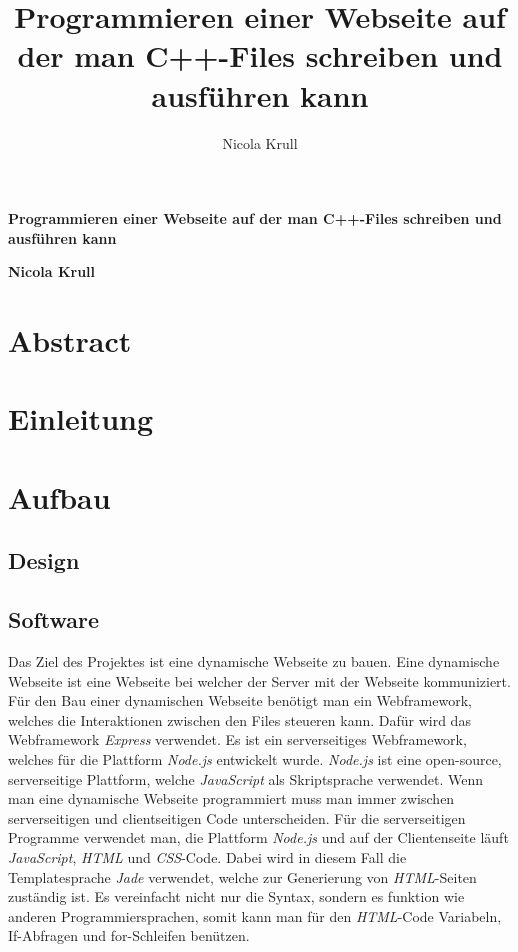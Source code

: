 \documentclass[10pt]{article}
\title{Programmieren einer Webseite auf der man C++-Files schreiben und ausführen kann}
\author{Nicola Krull}
\begin{document}
	
	\begin{titlepage}
	\begin{center}
	\huge
	\textbf{Programmieren einer Webseite auf der man C++-Files schreiben und ausführen kann}
	
	\vspace{1cm}	
	
	\LARGE
	\textbf{Nicola Krull}
	\end{center}
\end{titlepage}
	
	\tableofcontents
	\newpage
	\section{Abstract}
	\section{Einleitung}
	\pagebreak
	\section{Aufbau}
	\subsection{Design}
	
	\subsection{Software}
	Das Ziel des Projektes ist eine dynamische Webseite zu bauen. Eine dynamische Webseite ist eine Webseite bei welcher der Server mit der Webseite kommuniziert.\cite{01} %
	Für den Bau einer dynamischen Webseite benötigt man ein Webframework, welches die Interaktionen zwischen den 			Files steueren kann. Dafür wird das Webframework \textit{Express} verwendet. Es ist ein serverseitiges Webframework, welches für die Plattform \textit{Node.js} entwickelt wurde.\cite{02} \textit{Node.js} ist eine open-source, serverseitige Plattform, welche \textit{JavaScript} als Skriptsprache verwendet.\cite{03}	Wenn man eine dynamische Webseite programmiert muss man immer zwischen serverseitigen und clientseitigen Code unterscheiden. Für die serverseitigen Programme verwendet man, die Plattform \textit{Node.js} und auf der Clientenseite läuft \textit{JavaScript}, \textit{HTML} und \textit{CSS}-Code. Dabei wird in diesem Fall die Templatesprache \textit{Jade} verwendet, welche zur Generierung von \textit{HTML}-Seiten zuständig ist. Es vereinfacht nicht nur die Syntax, sondern es funktion wie anderen Programmiersprachen, somit kann man für den \textit{HTML}-Code Variabeln, If-Abfragen und for-Schleifen benützen. \cite{04}
\end{document}
